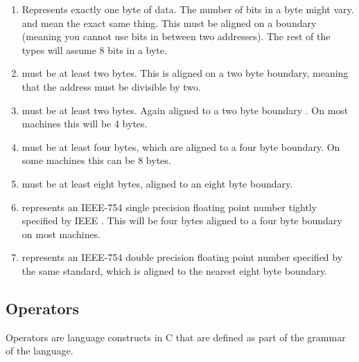 \begin{enumerate}
	\item {} Represents exactly one byte of data. The number of bits in a byte might vary.  and  mean the exact same thing. This must be aligned on a boundary (meaning you cannot use bits in between two addresses). The rest of the types will assume 8 bits in a byte.
	\item {} must be at least two bytes. This is aligned on a two byte boundary, meaning that the address must be divisible by two.
	\item {} must be at least two bytes. Again aligned to a two byte boundary \cite[P. 34]{ISON1124}. On most machines this will be 4 bytes.
	\item {} must be at least four bytes, which are aligned to a four byte boundary. On some machines this can be 8 bytes.
	\item {} must be at least eight bytes, aligned to an eight byte boundary.
	\item {} represents an IEEE-754 single precision floating point number tightly specified by IEEE \cite{4610935}. This will be four bytes aligned to a four byte boundary on most machines.
	\item {} represents an IEEE-754 double precision floating point number specified by the same standard, which is aligned to the nearest eight byte boundary.
\end{enumerate}

\subsection{Operators}

Operators are language constructs in C that are defined as part of the grammar of the language.

